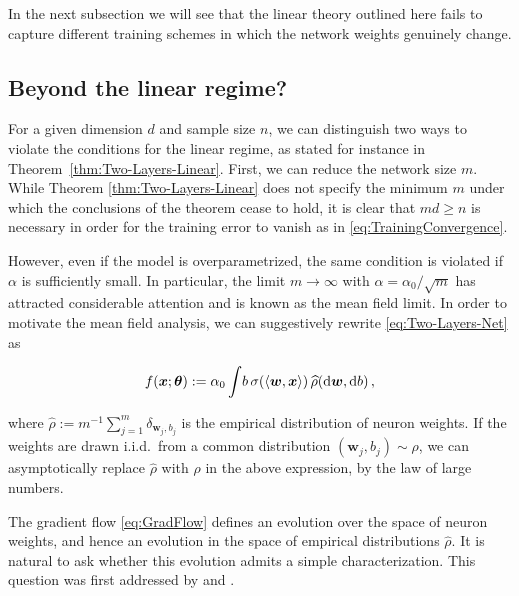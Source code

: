 In the next subsection we will see that the linear theory outlined here fails to capture different training schemes in which the network weights genuinely change.

\subsection{Beyond the linear regime?}
\label{sec:BeyondLinear}

For a given dimension $d$ and sample size $n$, we can distinguish two ways to violate the conditions for the linear regime, as stated for instance in Theorem~\ref{thm:Two-Layers-Linear}.
First, we can reduce the network size $m$. While Theorem \ref{thm:Two-Layers-Linear} does not specify the minimum $m$ under which the conclusions of the theorem cease to hold, it is clear that $md\ge n$ is necessary in order for the training error to vanish as in \eqref{eq:TrainingConvergence}.

However, even if the model is overparametrized, the same condition is violated if $\alpha$ is sufficiently small. In particular, the limit $m\to\infty$ with $\alpha= \alpha_0/\sqrt{m}$ has attracted considerable attention and is known as the mean field limit. In order to motivate the mean field analysis, we can suggestively rewrite \eqref{eq:Two-Layers-Net} as

\begin{align}
  f({\boldsymbol x};{\boldsymbol \theta}) := \alpha_0\int \! b\,\sigma(\langle{\boldsymbol w},{\boldsymbol x}\rangle)\, \widehat{\rho}({\rm d}{\boldsymbol w},{\rm d} b) \, ,
\end{align}

where $\widehat{\rho}:= m^{-1}\sum_{j=1}^{m}\delta_{{\boldsymbol w}_j,b_j}$ is the empirical distribution of neuron weights. If the weights are drawn i.i.d.\ from a common distribution $({\boldsymbol w}_j,b_j)\sim\rho$,
we can asymptotically replace $\widehat{\rho}$ with $\rho$ in the above expression, by the law of large numbers. 

The gradient flow \eqref{eq:GradFlow} defines an evolution over the space of neuron weights,  and hence an evolution in the space of empirical distributions $\widehat{\rho}$. It is natural to ask whether this evolution admits a simple characterization. This question was first addressed by \cite{nitanda2017stochastic,mei2018mean,rotskoff2018neural,sirignano2020mean} and \cite{chizat2018global}. 


